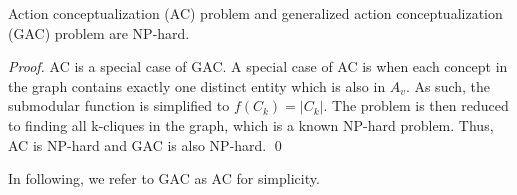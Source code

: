 %
\begin{lemma}
Action conceptualization (AC) problem and generalized action
conceptualization (GAC) problem are NP-hard.
\end{lemma}
\begin{proof}
AC is a special case of GAC.
A special case of AC is when each concept in the graph
contains exactly one distinct entity which is also in $A_v$.
As such, the submodular function is simplified to $f(C_k) = |C_k|$.
The problem is then reduced to finding all k-cliques in the graph,
which is a known NP-hard problem\cite{Vassilevska2009254}.
Thus, AC is NP-hard and GAC is also NP-hard.
\qed
\end{proof}

In following, we refer to GAC as AC for simplicity.
